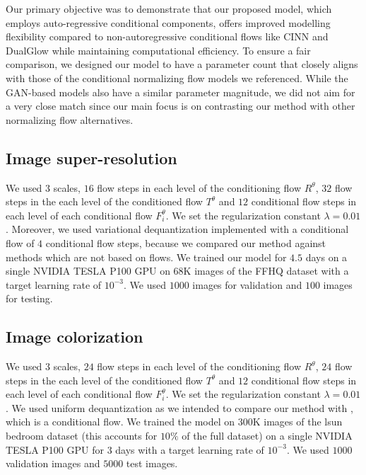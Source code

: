Our primary objective was to demonstrate that our proposed model, which employs auto-regressive conditional components, offers improved modelling flexibility compared to non-autoregressive conditional flows like CINN and DualGlow while maintaining computational efficiency. To ensure a fair comparison, we designed our model to have a parameter count that closely aligns with those of the conditional normalizing flow models we referenced. While the GAN-based models also have a similar parameter magnitude, we did not aim for a very close match since our main focus is on contrasting our method with other normalizing flow alternatives.
\color{black}

\subsection{Image super-resolution}
We used $3$ scales, $16$ flow steps in each level of the conditioning flow $R^\theta$, $32$ flow steps in the each level of the conditioned flow $T^\theta$ and $12$ conditional flow steps in each level of each conditional flow $F_i^{\theta}$. We set the regularization constant $\lambda = 0.01$. Moreover, we used variational dequantization implemented with a conditional flow of $4$ conditional flow steps, because we compared our method against methods which are not based on flows. We trained our model for $4.5$ days on a single NVIDIA TESLA P100 GPU on $68$K images of the FFHQ dataset with a target learning rate of $10^{-3}$. We used $1000$ images for validation and $100$ images for testing.


\subsection{Image colorization}

We used $3$ scales, $24$ flow steps in each level of the conditioning flow $R^\theta$, $24$ flow steps in the each level of the conditioned flow $T^\theta$ and $12$ conditional flow steps in each level of each conditional flow $F_i^{\theta}$. We set the regularization constant $\lambda = 0.01$. We used uniform dequantization as we intended to compare our method with \cite{ardizzone2019guided}, which is a conditional flow. We trained the model on $300$K images of the lsun bedroom dataset (this accounts for $10\%$ of the full dataset) on a single NVIDIA TESLA P100 GPU for 3 days with a target learning rate of $10^{-3}$. We used $1000$ validation images and $5000$ test images.

